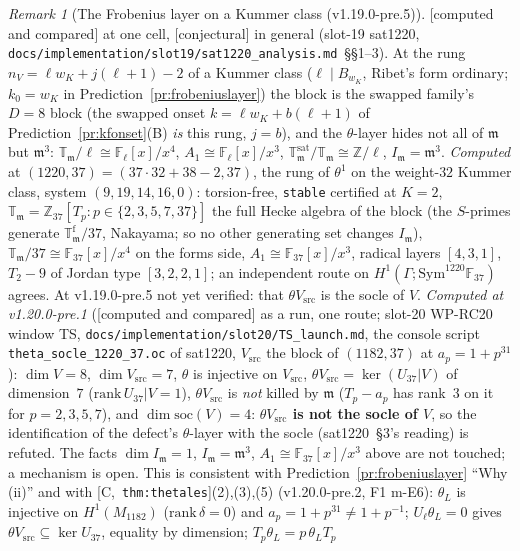 \documentclass[11pt]{article}
\theoremstyle{remark}
\newtheorem{remark}[theorem]{Remark}
\newcommand{\F}{\mathbb{F}}
\newcommand{\Z}{\mathbb{Z}}
\newcommand{\Sym}{\mathrm{Sym}}
\newcommand{\Ga}{\Gamma}
\newcommand{\Fl}{\F_\ell}
\newcommand{\T}{\mathbb{T}}
\newcommand{\m}{\mathfrak{m}}
\newcommand{\HA}[1]{[C,~\texttt{#1}]}      %
\newcommand{\CONJ}{\textsf{[conjectural]}}
\newcommand{\CMPD}{\textsf{[computed and compared]}}   %
\begin{document}
\begin{remark}[The Frobenius layer on a Kummer class (v1.19.0-pre.5)]\label{rmk:frobkummer}
\CMPD{} at one cell, \CONJ{} in general (slot-19 sat1220, \texttt{docs/implementation/slot19/sat1220\_analysis.md}~\S\S1--3). At the rung $n_V=\ell w_K+j(\ell+1)-2$ of a Kummer class
($\ell\mid B_{w_K}$, Ribet's form ordinary; $k_0=w_K$ in Prediction~\ref{pr:frobeniuslayer}) the block is the swapped family's $D=8$ block (the swapped onset
$k=\ell w_K+b(\ell+1)$ of Prediction~\ref{pr:kfonset}(B) \emph{is} this rung, $j=b$), and the $\theta$-layer hides not all of $\m$ but $\m^{3}$: $\T_\m/\ell\cong\Fl[x]/x^{4}$,
$A_1\cong\Fl[x]/x^{3}$, $\T^{\mathrm{sat}}_\m/\T_\m\cong\Z/\ell$, $I_\m=\m^{3}$. \emph{Computed} at $(1220,37)=(37\cdot32+38-2,37)$, the rung of $\theta^{1}$ on the weight-$32$ Kummer class,
system $(9,19,14,16,0)$: torsion-free, \texttt{stable} certified at $K=2$, $\T_\m=\Z_{37}[T_p:p\in\{2,3,5,7,37\}]$ the full Hecke algebra of the block (the $S$-primes generate
$\T^{\mathrm f}_\m/37$, Nakayama; so no other generating set changes $I_\m$), $\T_\m/37\cong\F_{37}[x]/x^{4}$ on the forms side, $A_1\cong\F_{37}[x]/x^{3}$, radical layers $[4,3,1]$,
$T_2-9$ of Jordan type $[3,2,2,1]$; an independent route on $H^{1}(\Ga;\Sym^{1220}\F_{37})$ agrees. At v1.19.0-pre.5 not yet verified: that $\theta V_{\mathrm{src}}$ is the socle of $V$. \emph{Computed at v1.20.0-pre.1} (\CMPD{} as a run, one route; slot-20 WP-RC20 window TS,
\texttt{docs/implementation/slot20/TS\_launch.md}, the console script \texttt{theta\_socle\_1220\_37.oc} of sat1220, $V_{\mathrm{src}}$ the block of $(1182,37)$ at $a_p=1+p^{31}$): $\dim V=8$,
$\dim V_{\mathrm{src}}=7$, $\theta$ is injective on $V_{\mathrm{src}}$, $\theta V_{\mathrm{src}}=\ker(U_{37}|V)$ of dimension~$7$ ($\mathrm{rank}\,U_{37}|V=1$), $\theta V_{\mathrm{src}}$ is \emph{not} killed by
$\m$ ($T_p-a_p$ has rank~$3$ on it for $p=2,3,5,7$), and $\dim\mathrm{soc}(V)=4$: \textbf{$\theta V_{\mathrm{src}}$ is not the socle of $V$}, so the identification of the defect's
$\theta$-layer with the socle (sat1220~\S3's reading) is refuted. The facts $\dim I_\m=1$, $I_\m=\m^{3}$, $A_1\cong\F_{37}[x]/x^{3}$ above are not touched; a mechanism is open. This is consistent with Prediction~\ref{pr:frobeniuslayer} ``Why (ii)'' and with \HA{thm:thetales}(2),(3),(5) (v1.20.0-pre.2, F1 m-E6): $\theta_L$ is injective
on $H^{1}(M_{1182})$ ($\mathrm{rank}\,\delta=0$) and $a_p=1+p^{31}\ne1+p^{-1}$; $U_\ell\theta_L=0$ gives $\theta V_{\mathrm{src}}\subseteq\ker U_{37}$, equality by dimension; $T_p\theta_L=p\,\theta_LT_p$

\end{remark}
\end{document}

